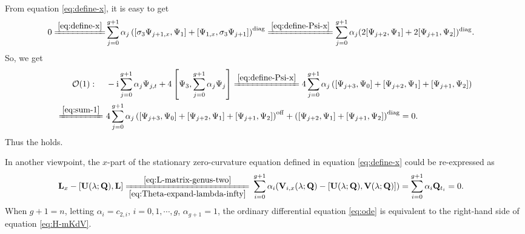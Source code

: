 \documentclass[11pt,reqno]{amsart}
\newcommand{\ii}{\mathrm{i}}
\newcommand{\diag}{\mathrm{diag}}
\newcommand{\off}{\mathrm{off}}
\numberwithin{equation}{section}
\begin{document}
\begin{proof-prop-matrix-L}
\begin{equation}
\begin{split}
		\end{split}
\end{equation}
From equation \eqref{eq:define-x}, it is easy to get
\begin{equation}\nonumber
		\begin{split}
			0\xlongequal{\eqref{eq:define-x}}&
		\sum_{j=0}^{g+1}\alpha_j	\left(\left[\sigma_3\Psi_{j+1,x},\Psi_{1}\right]+\left[\Psi_{1,x},\sigma_3\Psi_{j+1}\right]\right)^{\diag}
			\xlongequal{\eqref{eq:define-Psi-x}}
			 \sum_{j=0}^{g+1}\alpha_j(2[ \Psi_{j+2},\Psi_{1}]+2[\Psi_{j+1},\Psi_2])^{\diag}.
		\end{split}
	\end{equation}
	So, we get
	\begin{equation}\nonumber
		\begin{split}
			\mathcal{O}(1): \quad 
			& \ -\ii \sum_{j=0}^{g+1}\alpha_j \Psi_{j,t}+4\left[ \Psi_3,\sum_{j=0}^{g+1}\alpha_j\Psi_{j}\right] 
			\xlongequal{\eqref{eq:define-Psi-x}} 4\sum_{j=0}^{g+1}\alpha_j  \left(\left[\Psi_{j+3}, \Psi_{0}\right]+\left[\Psi_{j+2}, \Psi_{1}\right]+\left[\Psi_{j+1}, \Psi_{2}\right]\right) \\
			\xlongequal{\eqref{eq:sum-1}}&	\  4\sum_{j=0}^{g+1}\alpha_j  \left(\left[\Psi_{j+3}, \Psi_{0}\right]+\left[\Psi_{j+2}, \Psi_{1}\right]+\left[\Psi_{j+1}, \Psi_{2}\right]\right)^{\off}+ \left(\left[\Psi_{j+2}, \Psi_{1}\right]+\left[\Psi_{j+1}, \Psi_{2}\right]\right)^{\diag}=0.
		\end{split}
	\end{equation}
	Thus the  holds.
\end{proof-prop-matrix-L}

In another viewpoint, the $x$-part of the stationary zero-curvature equation defined in equation \eqref{eq:define-x} could be re-expressed as
\begin{equation}\nonumber
	\begin{split}
		\mathbf{L}_x-[\mathbf{U}(\lambda;\mathbf{Q}),\mathbf{L}]\xlongequal[\eqref{eq:Theta-expand-lambda-infty}]{\eqref{eq:L-matrix-genus-two}} &\
		\sum_{i=0}^{g+1}\alpha_i(\mathbf{V}_{i,x}(\lambda;\mathbf{Q})-[\mathbf{U}(\lambda;\mathbf{Q}),\mathbf{V}(\lambda;\mathbf{Q})])
		= \sum_{i=0}^{g+1}\alpha_i \mathbf{Q}_{t_i}=0.
	\end{split}
\end{equation}
When $g+1=n$, letting $\alpha_i=c_{2,i}$, $i = 0, 1,\cdots, g$, $\alpha_{g+1} = 1$, the ordinary differential equation \eqref{eq:ode} is equivalent to the right-hand side of equation \eqref{eq:H-mKdV}.
\end{document}
